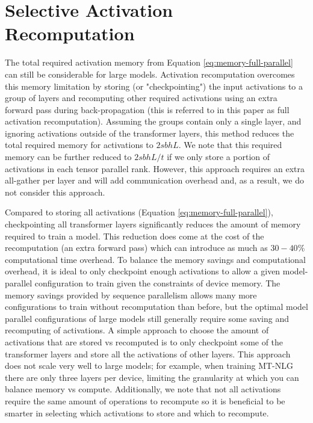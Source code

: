 \documentclass{article}
\begin{document}
\section{Selective Activation Recomputation}
\label{sec:activation-recomputation}

The total required activation memory from Equation \ref{eq:memory-full-parallel} can still be considerable for large models. Activation recomputation \cite{activation-recomputation} overcomes this memory limitation by storing (or "checkpointing") the input activations to a group of layers and recomputing other required activations using an extra forward pass during back-propagation (this is referred to in this paper as full activation recomputation). Assuming the groups contain only a single layer, and ignoring activations outside of the transformer layers, this method reduces the total required memory for activations to $2sbhL$. We note that this required memory can be further reduced to $2sbhL/t$ if we only store a portion of activations in each tensor parallel rank. However, this approach requires an extra all-gather per layer and will add communication overhead and, as a result, we do not consider this approach.

Compared to storing all activations (Equation \ref{eq:memory-full-parallel}), checkpointing all transformer layers significantly reduces the amount of memory required to train a model. %
This reduction does come at the cost of the recomputation (an extra forward pass) which can introduce as much as $30-40\%$ computational time overhead. To balance the memory savings and computational overhead, it is ideal to only checkpoint enough activations to allow a given model-parallel configuration to train given the constraints of device memory. The memory savings provided by sequence parallelism allows many more configurations to train without recomputation than before, but the optimal model parallel configurations of large models still generally require some saving and recomputing of activations. A simple approach to choose the amount of activations that are stored vs recomputed is to only checkpoint some of the transformer layers and store all the activations of other layers. This approach does not scale very well to large models; for example, when training MT-NLG there are only three layers per device, limiting the granularity at which you can balance memory vs compute. Additionally, we note that not all activations require the same amount of operations to recompute so it is beneficial to be smarter in selecting which activations to store and which to recompute.
\end{document}

